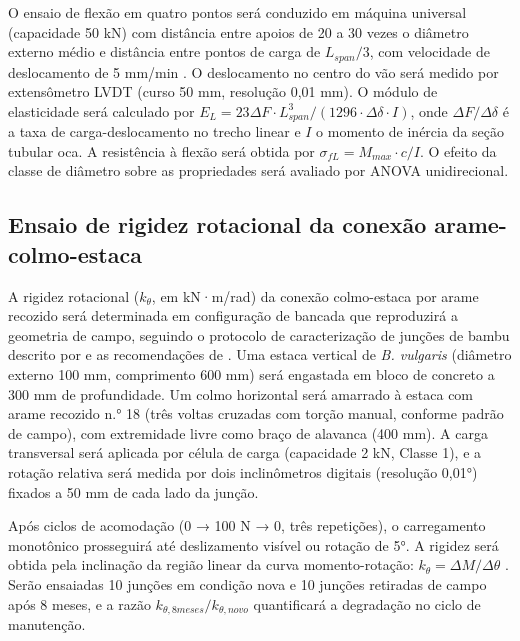 \documentclass[
  brazilian,
  authoryear,
  preprint]{elsarticle}
\begin{document}
O ensaio de flexão em quatro pontos será conduzido em máquina universal
(capacidade 50 kN) com distância entre apoios de 20 a 30 vezes o
diâmetro externo médio e distância entre pontos de carga de
\(L_{span}/3\), com velocidade de deslocamento de 5 mm/min
\citep{dixon_gibson_2014, richard_2013}. O deslocamento no centro do vão
será medido por extensômetro LVDT (curso 50 mm, resolução 0,01 mm). O
módulo de elasticidade será calculado por
\(E_L = 23 \Delta F \cdot L_{span}^3 / (1296 \cdot \Delta \delta \cdot I)\),
onde \(\Delta F / \Delta \delta\) é a taxa de carga-deslocamento no
trecho linear e \(I\) o momento de inércia da seção tubular oca. A
resistência à flexão será obtida por
\(\sigma_{fL} = M_{max} \cdot c / I\). O efeito da classe de diâmetro
sobre as propriedades será avaliado por ANOVA unidirecional.

\subsection{Ensaio de rigidez rotacional da conexão
arame-colmo-estaca}\label{ensaio-de-rigidez-rotacional-da-conexuxe3o-arame-colmo-estaca}

A rigidez rotacional (\(k_\theta\), em kN·m/rad) da conexão colmo-estaca
por arame recozido será determinada em configuração de bancada que
reproduzirá a geometria de campo, seguindo o protocolo de caracterização
de junções de bambu descrito por \citet{nurmadina_et_al_2017} e as
recomendações de \citet{kaminski_et_al_2016}. Uma estaca vertical de
\emph{B. vulgaris} (diâmetro externo 100 mm, comprimento 600 mm) será
engastada em bloco de concreto a 300 mm de profundidade. Um colmo
horizontal será amarrado à estaca com arame recozido n.° 18 (três voltas
cruzadas com torção manual, conforme padrão de campo), com extremidade
livre como braço de alavanca (400 mm). A carga transversal será aplicada
por célula de carga (capacidade 2 kN, Classe 1), e a rotação relativa
será medida por dois inclinômetros digitais (resolução 0,01°) fixados a
50 mm de cada lado da junção.

Após ciclos de acomodação (0 → 100 N → 0, três repetições), o
carregamento monotônico prosseguirá até deslizamento visível ou rotação
de 5°. A rigidez será obtida pela inclinação da região linear da curva
momento-rotação: \(k_\theta = \Delta M / \Delta \theta\)
\citep{richard_2013}. Serão ensaiadas 10 junções em condição nova e 10
junções retiradas de campo após 8 meses, e a razão
\(k_{\theta,8meses} / k_{\theta,novo}\) quantificará a degradação no
ciclo de manutenção.
\end{document}

